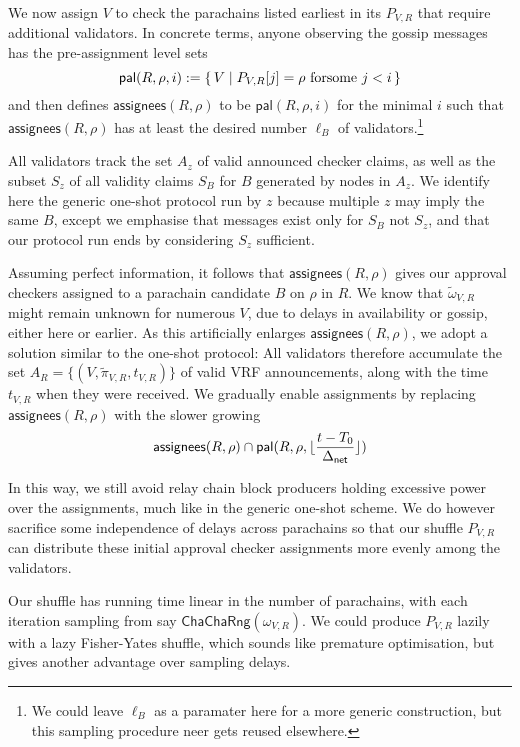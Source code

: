 We now assign $V$ to check the parachains listed earliest in its $P_{V,R}$ that require additional validators.
%
In concrete terms, anyone observing the gossip messages has the pre-assignment level sets
$$ \mathsf{pal}(R,\rho,i) := \Setst{ V }{ P_{V,R}[j] = \rho \mathrm{\ for some\ } j < i } $$
and then defines $\mathsf{assignees}(R,\rho)$ to be $\mathsf{pal}(R,\rho,i)$ for the minimal $i$ such that $\mathsf{assignees}(R,\rho)$ has at least the desired number $\ell_B$ of validators.\footnote{We could leave $\ell_B$ as a paramater here for a more generic construction, but this sampling procedure neer gets reused elsewhere.}


All validators track the set $A_z$ of valid announced checker claims, as well as the subset $S_z$ of all validity claims $S_B$ for $B$ generated by nodes in $A_z$.  We identify here the generic one-shot protocol run by $z$ because multiple $z$ may imply the same $B$, except we emphasise that messages exist only for $S_B$ not $S_z$, and that our protocol run ends by considering $S_z$ sufficient.  


Assuming perfect information, it follows that $\mathsf{assignees}(R,\rho)$ gives our approval checkers assigned to a parachain candidate $B$ on $\rho$ in $R$. 
%
We know that $\tilde{\omega}_{V,R}$ might remain unknown for numerous $V$, due to delays in availability or gossip, either here or earlier.  As this artificially enlarges $\mathsf{assignees}(R,\rho)$, we adopt a solution similar to the one-shot protocol:  All validators therefore accumulate the set $A_R = \{ (V,\tilde{\pi}_{V,R},t_{V,R}) \}$ of valid VRF announcements, along with the time $t_{V,R}$ when they were received.
We gradually enable assignments by replacing $\mathsf{assignees}(R,\rho)$ with the slower growing
$$ \mathsf{assignees}(R,\rho) \cap \mathsf{pal}(R,\rho,\lfloor {t - T_0 \over \ensuremath{\Delta_{\mathsf{net}}}} \rfloor) $$


In this way, we still avoid relay chain block producers holding excessive power over the assignments, much like in the generic one-shot scheme.  We do however sacrifice some independence of delays across parachains so that our shuffle $P_{V,R}$ can distribute these initial approval checker assignments more evenly among the validators.  

Our shuffle has running time linear in the number of parachains, with each iteration sampling from say $\mathsf{ChaChaRng}(\omega_{V,R})$.  We could produce $P_{V,R}$ lazily with a lazy Fisher-Yates shuffle, which sounds like premature optimisation, but gives another advantage over sampling delays.


